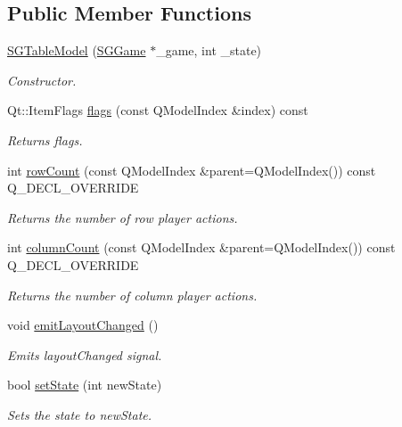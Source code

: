 \subsection*{Public Member Functions}
\begin{DoxyCompactItemize}
\item 
\mbox{\label{classSGTableModel_aa048e2bf2957daacc383c961b98f9c52}} 
\hyperlink{classSGTableModel_aa048e2bf2957daacc383c961b98f9c52}{S\+G\+Table\+Model} (\hyperlink{classSGGame}{S\+G\+Game} $\ast$\+\_\+game, int \+\_\+state)
\begin{DoxyCompactList}\small\item\em Constructor. \end{DoxyCompactList}\item 
Qt\+::\+Item\+Flags \hyperlink{classSGTableModel_aa0a7a0d77e74ce1f799b52a1dc5fc9d6}{flags} (const Q\+Model\+Index \&index) const
\begin{DoxyCompactList}\small\item\em Returns flags. \end{DoxyCompactList}\item 
\mbox{\label{classSGTableModel_acc83fe7efd6aba0e69c4b2a70bd2ded1}} 
int \hyperlink{classSGTableModel_acc83fe7efd6aba0e69c4b2a70bd2ded1}{row\+Count} (const Q\+Model\+Index \&parent=Q\+Model\+Index()) const Q\+\_\+\+D\+E\+C\+L\+\_\+\+O\+V\+E\+R\+R\+I\+DE
\begin{DoxyCompactList}\small\item\em Returns the number of row player actions. \end{DoxyCompactList}\item 
\mbox{\label{classSGTableModel_a132a3d56c2076e5c27596672a6e5205f}} 
int \hyperlink{classSGTableModel_a132a3d56c2076e5c27596672a6e5205f}{column\+Count} (const Q\+Model\+Index \&parent=Q\+Model\+Index()) const Q\+\_\+\+D\+E\+C\+L\+\_\+\+O\+V\+E\+R\+R\+I\+DE
\begin{DoxyCompactList}\small\item\em Returns the number of column player actions. \end{DoxyCompactList}\item 
\mbox{\label{classSGTableModel_a1ed208aebe952b152e1234b17a347689}} 
void \hyperlink{classSGTableModel_a1ed208aebe952b152e1234b17a347689}{emit\+Layout\+Changed} ()
\begin{DoxyCompactList}\small\item\em Emits layout\+Changed signal. \end{DoxyCompactList}\item 
\mbox{\label{classSGTableModel_a24af3154e28c520ca9e2d5e4980814f4}} 
bool \hyperlink{classSGTableModel_a24af3154e28c520ca9e2d5e4980814f4}{set\+State} (int new\+State)
\begin{DoxyCompactList}\small\item\em Sets the state to new\+State. \end{DoxyCompactList}\end{DoxyCompactItemize}
